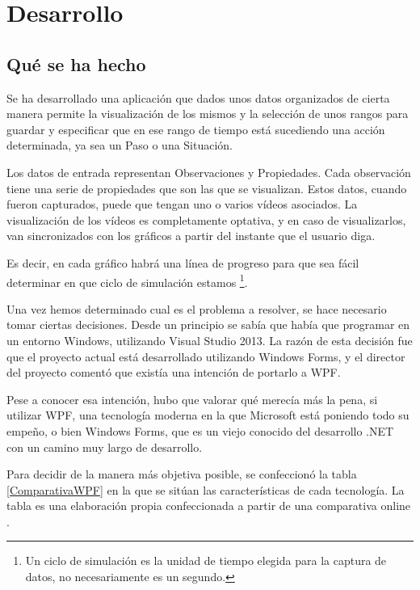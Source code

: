 \chapter{Desarrollo}

\section{Qu\'{e} se ha hecho}
Se ha desarrollado una aplicaci\'{o}n que dados unos datos organizados
de cierta manera permite la visualizaci\'{o}n de los mismos y
la selecci\'{o}n de unos rangos para guardar y especificar que en ese rango de tiempo
est\'{a} sucediendo una acci\'{o}n determinada, ya sea un Paso o una Situaci\'on.

Los datos de entrada representan Observaciones y Propiedades. Cada observaci\'{o}n tiene una serie
de propiedades que son las que se visualizan. Estos datos, cuando fueron capturados, puede
que tengan uno o varios v\'{i}deos asociados. La visualizaci\'{o}n de los v\'{i}deos es completamente
optativa, y en caso de visualizarlos, van sincronizados con los gr\'{a}ficos a partir del instante que el 
usuario diga.

Es decir, en cada gr\'{a}fico habr\'{a} una l\'{i}nea de progreso para que sea f\'{a}cil determinar en que ciclo
de simulaci\'{o}n estamos \footnote{Un ciclo de simulaci\'{o}n es la unidad de tiempo elegida para la captura de datos, no
    necesariamente es un segundo.}.

Una vez hemos determinado cual es el problema a resolver, se hace necesario tomar ciertas decisiones.
Desde un principio se sab\'ia que hab\'ia que programar en un entorno Windows, utilizando Visual Studio 2013.
La raz\'on de esta decisi\'on fue que el proyecto actual est\'a desarrollado utilizando Windows Forms, y el 
director del proyecto coment\'o que exist\'ia una intenci\'on de portarlo a WPF.

Pese a conocer esa intenci\'on, hubo que valorar qu\'e merec\'ia m\'as la pena, si utilizar WPF, una tecnolog\'ia moderna
en la que Microsoft est\'a poniendo todo su empe\~no, o bien Windows Forms, que es un viejo conocido del desarrollo
.NET con un camino muy largo de desarrollo.

Para decidir de la manera m\'as objetiva posible, se confeccion\'o la tabla \ref{ComparativaWPF} en la que se sit\'uan 
las caracter\'isticas de cada tecnolog\'ia. La tabla es una elaboraci\'on propia confeccionada a partir de una comparativa
online \cite{WPFvsWinForms:Comparative}.

